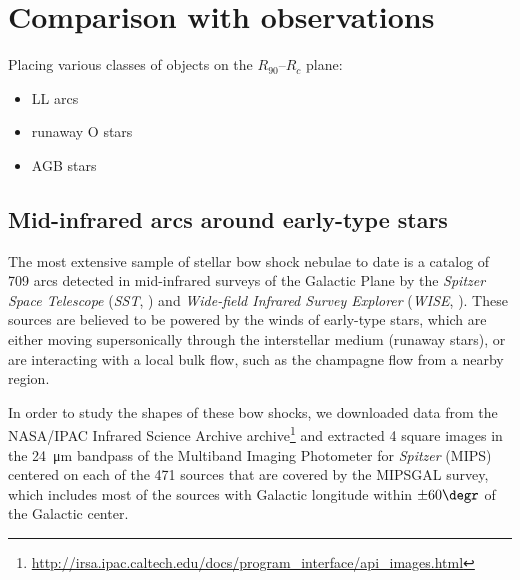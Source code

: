 \newcommand\hii{\ion{H}{ii}}


\section{Comparison with observations}
\label{sec:comp-with-observ}


Placing various classes of objects on the \(R_{90}\)--\(R_c\) plane:
\begin{itemize}
\item LL arcs
\item runaway O stars
\item AGB stars
\end{itemize}

\subsection{Mid-infrared arcs around early-type stars}
\label{sec:mid-infrared-arcs}

The most extensive sample of stellar bow shock nebulae to date is a
catalog of 709 arcs \citep{Kobulnicky:2016a} detected in mid-infrared
surveys of the Galactic Plane by the \textit{Spitzer Space Telescope}
(\textit{SST}, \citealp{Werner:2004a}) and \textit{Wide-field Infrared
  Survey Explorer} (\textit{WISE}, \citealp{Wright:2010a}).  These
sources are believed to be powered by the winds of early-type stars,
which are either moving supersonically through the interstellar medium
(runaway stars), or are interacting with a local bulk flow, such as
the champagne flow from a nearby \hii{} region.

In order to study the shapes of these bow shocks, we downloaded data
from the NASA/IPAC Infrared Science Archive archive\footnote{
  \url{http://irsa.ipac.caltech.edu/docs/program_interface/api_images.html}}
and extracted 4\arcmin{} square images in the \SI{24}{\um} bandpass of
the Multiband Imaging Photometer for \textit{Spitzer} (MIPS) centered
on each of the 471 \citet{Kobulnicky:2016a} sources that are covered
by the MIPSGAL \citep{Carey:2009a} survey, which includes most of the
sources with Galactic longitude within \(\pm 60\degr\) of the Galactic
center.

